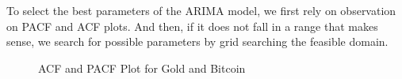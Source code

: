 \documentclass[12pt,a4paper]{article}
\begin{document}
\begin{spacing}{1.2}
To select the best parameters of the ARIMA model, we first rely on observation on PACF and ACF plots. And then, if it does not fall in a range that makes sense, we search for possible parameters by grid searching the feasible domain.

\begin{figure}[htp]
	\begin{center}
		\caption{ACF and PACF Plot for Gold and Bitcoin}
		\label{fig:acf_pacf}
	\end{center}
\end{figure}


\end{spacing}
\end{document}

